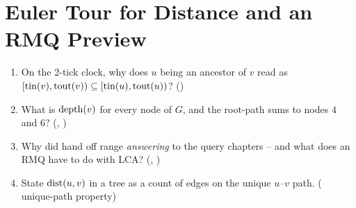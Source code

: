 \section{Euler Tour for Distance and an RMQ Preview}\label{sec:c24-dist}

\begin{previouslybox}
\begin{enumerate}[nosep, leftmargin=1.6em]
  \item On the 2-tick clock, why does $u$ being an ancestor of $v$ read as
        $[\operatorname{tin}(v),\operatorname{tout}(v)) \subseteq [\operatorname{tin}(u),\operatorname{tout}(u))$? ()
  \item What is $\operatorname{depth}(v)$ for every node of $G$, and the root-path sums to nodes $4$ and
        $6$? (, )
  \item Why did  hand off range \emph{answering} to the query chapters --
        and what does an RMQ have to do with LCA? (, )
  \item State $\operatorname{dist}(u,v)$ in a tree as a count of edges on the unique $u$--$v$ path.
        ( unique-path property)
\end{enumerate}
\end{previouslybox}

